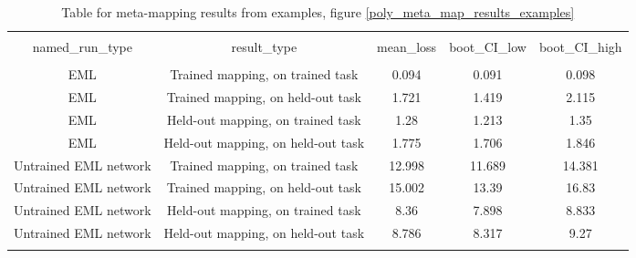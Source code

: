 \begin{table}[H]
\scriptsize
\centering
\begin{tabular}{@{\extracolsep{5pt}} ccccc}
\\[-1.8ex]\hline
\hline \\[-1.8ex]
named\_run\_type & result\_type & mean\_loss & boot\_CI\_low & boot\_CI\_high \\
\hline \\[-1.8ex]
EML & Trained mapping, on trained task & 0.094 & 0.091 & 0.098 \\
EML & Trained mapping, on held-out task & 1.721 & 1.419 & 2.115 \\
EML & Held-out mapping, on trained task & 1.28 & 1.213 & 1.35 \\
EML & Held-out mapping, on held-out task & 1.775 & 1.706 & 1.846 \\
Untrained EML network & Trained mapping, on trained task & 12.998 & 11.689 & 14.381 \\
Untrained EML network & Trained mapping, on held-out task & 15.002 & 13.39 & 16.83 \\
Untrained EML network & Held-out mapping, on trained task & 8.36 & 7.898 & 8.833 \\
Untrained EML network & Held-out mapping, on held-out task & 8.786 & 8.317 & 9.27 \\
\hline \\[-1.8ex]
\end{tabular}
\caption{Table for meta-mapping results from examples, figure \ref{poly_meta_map_results_examples}}
\end{table}

